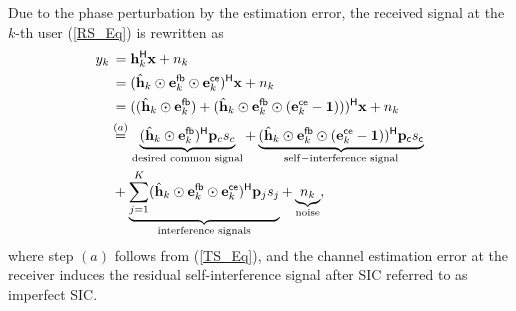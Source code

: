 \documentclass[draftclsnofoot, onecolumn, comsoc, 12pt]{IEEEtran}
\begin{document}
{Due to the phase perturbation by the estimation error, the received signal at the $k$-th user (\ref{RS_Eq}) is rewritten as
\begin{align}
    \label{RSC_Eq} 
    y_{k} & \, = \mathbf{h}_{k}^{\sf{H}}\mathbf{x} + n_{k} \nonumber \\  
    & \,= (\hat{\mathbf{h}}_{k} \odot {\mathbf{e}_{k}^{\sf{fb}}} \odot {\mathbf{e}_{k}^{\sf{ce}}})^{\sf{H}} \mathbf{x} + n_{k} \nonumber \\
    & \,= ((\hat{\mathbf{h}}_{k} \odot {\mathbf{e}_{k}^{\sf{fb}}}) + (\hat{\mathbf{h}}_{k} \odot {\mathbf{e}_{k}^{\sf{fb}}} \odot ({\mathbf{e}_{k}^{\sf{ce}}} - \mathbf{1})))^{\sf{H}} \mathbf{x} + n_{k} \nonumber \\
    & \overset{(a)}{=} \underbrace{(\hat{\mathbf{h}}_{k} \odot {\mathbf{e}_{k}^{\sf{fb}}})^{\sf{H}} \mathbf{p}_{c} s_{c}}_{\rm{desired \,\, common \,\, signal}}
    + \underbrace{(\hat{\mathbf{h}}_{k} \odot {\mathbf{e}_{k}^{\sf{fb}}} \odot ({\mathbf{e}_{k}^{\sf{ce}}} - \mathbf{1}))^{\sf{H}} \mathbf{p}_{\sf{c}} s_{\sf{c}}}_{\rm{self-interference \,\, signal}} \nonumber \\
    & \, + \underbrace{\sum_{j=1}^{K} (\hat{\mathbf{h}}_{k} \odot {\mathbf{e}_{k}^{\sf{fb}}} \odot {\mathbf{e}_{k}^{\sf{ce}}})^{\sf{H}} \mathbf{p}_{j} s_{j}}_{\rm{interference \,\, signals}} + \underbrace{n_{k}}_{\rm{noise}},
\end{align}
where step $(a)$ follows from (\ref{TS_Eq}), and the channel estimation error at the receiver induces the residual self-interference signal after SIC referred to as imperfect SIC.} 
\end{document}
